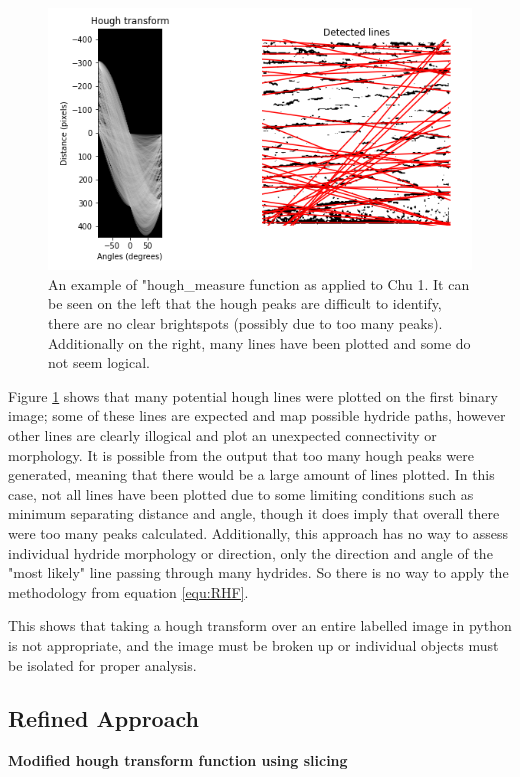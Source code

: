 \documentclass{article}
\begin{document}
    \begin{figure}[H]
        \centering
        \includegraphics[scale=0.7]{Figures/houghtrans_initial.png}
        \caption{An example of "hough\_measure function as applied to Chu 1. It can be seen on the left that the hough peaks are difficult to identify, there are no clear brightspots (possibly due to too many peaks). Additionally on the right, many lines have been plotted and some do not seem logical.}
        \label{fig:hough_initial}
    \end{figure}
    
    \noindent Figure \ref{fig:hough_initial} shows that many potential hough lines were plotted on the first binary image; some of these lines are expected and map possible hydride paths, however other lines are clearly illogical and plot an unexpected connectivity or morphology. It is possible from the output that too many hough peaks were generated, meaning that there would be a large amount of lines plotted. In this case, not all lines have been plotted due to some limiting conditions such as minimum separating distance and angle, though it does imply that overall there were too many peaks calculated. Additionally, this approach has no way to assess individual hydride morphology or direction, only the direction and angle of the "most likely" line passing through many hydrides. So there is no way to apply the methodology from equation \ref{equ:RHF}.
    
    This shows that taking a hough transform over an entire labelled image in python is not appropriate, and the image must be broken up or individual objects must be isolated for proper analysis.
   

\subsection{Refined Approach}
\textbf{Modified hough transform function using slicing}
\end{document}

